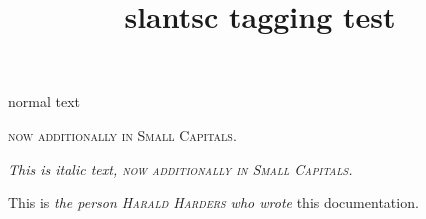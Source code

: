\documentclass{article}
\title{slantsc tagging test}
\begin{document}
normal text

{\scshape now additionally in Small Capitals.}

{\itshape This is italic text, \scshape now additionally in Small Capitals.}

This is \emph{the person \textsc{Harald Harders} who wrote} this
documentation.
\end{document}
